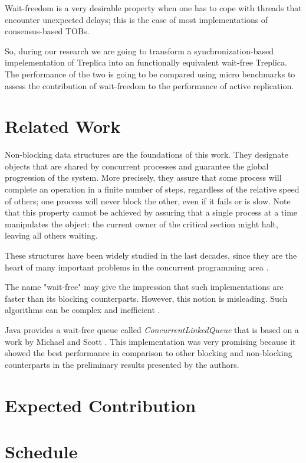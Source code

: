 \documentclass[12pt,twoside,a4paper]{article}
\begin{document}
Wait-freedom is a very  desirable property when one has to cope with threads  
that encounter unexpected delays; this  is the case
of  most  implementations of  consensus-based  TOBs. 

So, during  our research   we  are   going   to   transform  a   
synchronization-based impelementation  of  Treplica \cite{vieira2008}   into  an 
 functionally equivalent  wait-free   Treplica.   The  performance of the two is 
going to be compared using micro benchmarks to assess the contribution  of 
wait-freedom to the  performance of active replication.

\section{Related Work}
\label{sec:related}

Non-blocking data structures are the foundations of this work. They designate 
objects that are shared by concurrent processes and guarantee the global 
progression of the system. More precisely, they  assure that some process will 
complete an operation in a finite number of steps, regardless of the relative 
speed of others; one process will never block the other, even if it fails or is 
slow. Note that this  property cannot be achieved by assuring that a single 
process at a time manipulates the object: the current owner of the critical 
section might halt, leaving all others waiting. 

These structures have been widely studied in the last decades, since they are 
the heart of many important problems in the concurrent	 programming area 
\cite{herlihy2011art}.

The name "wait-free" may give the impression that such implementations are 
faster than its blocking counterparts. However, this notion is misleading.  Such 
algorithms can be complex and inefficient \cite{attiya1994wait}.  

Java provides a wait-free queue called \textit{ConcurrentLinkedQueue} that is 
based on a work by Michael and Scott \cite{michael1996simple}. This 
implementation was very promising because it showed the best performance in 
comparison to other blocking and non-blocking counterparts in the preliminary 
results presented by the authors. 


\section{Expected Contribution}
\label{sec:contrib}


 
\section{Schedule}
\label{sec:schedule}


\vskip 15mm

{}

\end{document}
